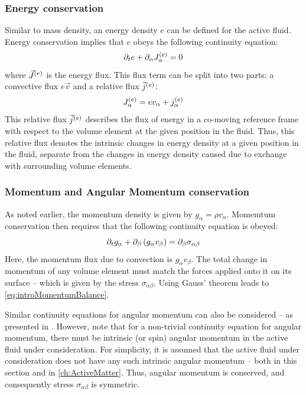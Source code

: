 \subsubsection{Energy conservation}\label{subsubsec:energyConserve}
Similar to mass density, an energy density $e$ can be defined for the active fluid. Energy conservation implies that $e$ obeys the following continuity equation:
\begin{equation}\label{eq:introEnergyBalance}
    \inlinePartial{t}{e} + \inlinePartial{\alpha}{\speciesSuper{J}{e}_\alpha} = 0
\end{equation}
where $\vec{J}^{(e)}$ is the energy flux. This flux term can be split into two parts: a convective flux $e\vec{v}$ and a relative flux $\vec{j}^{(e)}$:
\begin{equation}\label{eq:introEnergyFlux}
    J^{(e)}_\alpha = ev_\alpha + j^{(e)}_\alpha
\end{equation}
This relative flux $\vec{j}^{(e)}$ describes the flux of energy in a co-moving reference frame with respect to the volume element at the given position in the fluid. Thus, this relative flux denotes the intrinsic changes in energy density at a given position in the fluid, separate from the changes in energy density caused due to exchange with surrounding volume elements.

\subsubsection{Momentum and Angular Momentum conservation}\label{subsubsec:momentumConserve}
As noted earlier, the momentum density is given by $g_\alpha = \rho v_\alpha$. Momemtum conservation then requires that the following continuity equation is obeyed:
\begin{equation}\label{eq:introMomentumBalance}
    \inlinePartial{t}{g_\alpha} + \inlinePartial{\beta}{\left(g_\alpha v_\beta\right)} = \inlinePartial{\beta}{\sigma_{\alpha\beta}}
\end{equation}
Here, the momentum flux due to convection is $g_\alpha v_\beta$. The total change in momentum of any volume element must match the forces applied onto it on its surface -- which is given by the stress $\sigma_{\alpha\beta}$. Using Gauss' theorem leads to \autoref{eq:introMomentumBalance}.

Similar continuity equations for angular momentum can also be considered -- as presented in \cite{julicher2018hydrodynamic,sebastian2012activeChiral}. However, note that for a non-trivial continuity equation for angular momentum, there must be intrinsic (or spin) angular momentum in the active fluid under consideration. For simplicity, it is assumed that the active fluid under consideration does not have any such intrinsic angular momentum -- both in this section and in \autoref{ch:ActiveMatter}. Thus, angular momentum is conserved, and consequently stress $\sigma_{\alpha\beta}$ is symmetric.

